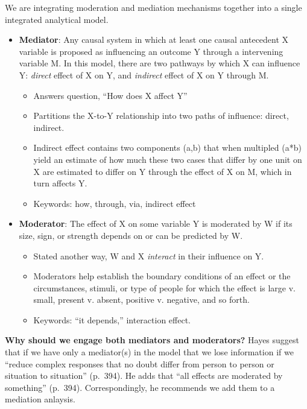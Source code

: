 \documentclass[
  english,
]{book}
\providecommand{\tightlist}{%
  \setlength{\itemsep}{0pt}\setlength{\parskip}{0pt}}
\begin{document}
We are integrating moderation and mediation mechanisms together into a single integrated analytical model.

\begin{itemize}
\tightlist
\item
  \textbf{Mediator}: Any causal system in which at least one causal antecedent X variable is proposed as influencing an outcome Y through a intervening variable M. In this model, there are two pathways by which X can influence Y: \emph{direct} effect of X on Y, and \emph{indirect} effect of X on Y through M.

  \begin{itemize}
  \tightlist
  \item
    Answers question, ``How does X affect Y''
  \item
    Partitions the X-to-Y relationship into two paths of influence: direct, indirect.
  \item
    Indirect effect contains two components (a,b) that when multipled (a*b) yield an estimate of how much these two cases that differ by one unit on X are estimated to differ on Y through the effect of X on M, which in turn affects Y.
  \item
    Keywords: how, through, via, indirect effect
  \end{itemize}
\item
  \textbf{Moderator}: The effect of X on some variable Y is moderated by W if its size, sign, or strength depends on or can be predicted by W.

  \begin{itemize}
  \tightlist
  \item
    Stated another way, W and X \emph{interact} in their influence on Y.\\
  \item
    Moderators help establish the boundary conditions of an effect or the circumstances, stimuli, or type of people for which the effect is large v. small, present v. absent, positive v. negative, and so forth.
  \item
    Keywords: ``it depends,'' interaction effect.
  \end{itemize}
\end{itemize}

\textbf{Why should we engage both mediators and moderators?} Hayes \citeyearpar{hayes_introduction_2018} suggest that if we have only a mediator(s) in the model that we lose information if we ``reduce complex responses that no doubt differ from person to person or situation to situation'' (p.~394). He adds that ``all effects are moderated by something'' (p.~394). Correspondingly, he recommends we add them to a mediation anlaysis.
\end{document}
